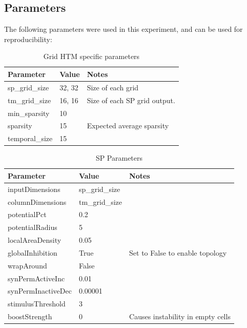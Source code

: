 \subsection{Parameters}
The following parameters were used in this experiment, and can be used for reproducibility:
\begin{table}[H]
    \centering
    \begin{tabularx}{\linewidth}{@{}XlX@{}}
        \toprule
        \textbf{Parameter} & \textbf{Value} & \textbf{Notes}               \\
        \midrule
        sp\_grid\_size     & 32, 32         & Size of each grid            \\
        tm\_grid\_size     & 16, 16         & Size of each SP grid output. \\
        min\_sparsity      & 10             &                              \\
        sparsity           & 15             & Expected average sparsity    \\
        temporal\_size     & 15             &                              \\
        \bottomrule
    \end{tabularx}
    \caption{Grid HTM specific parameters}
    \label{tab:surveillance_grid_htm}
\end{table}
\begin{table}[H]
    \centering
    \begin{tabularx}{\linewidth}{@{}XlX@{}}
        \toprule
        \textbf{Parameter} & \textbf{Value} & \textbf{Notes}                    \\
        \midrule
        inputDimensions    & sp\_grid\_size &                                   \\
        columnDimensions   & tm\_grid\_size &                                   \\
        potentialPct       & 0.2            &                                   \\
        potentialRadius    & 5              &                                   \\
        localAreaDensity   & 0.05           &                                   \\
        globalInhibition   & True           & Set to False to enable topology   \\
        wrapAround         & False          &                                   \\
        synPermActiveInc   & 0.01           &                                   \\
        synPermInactiveDec & 0.00001                                            \\
        stimulusThreshold  & 3              &                                   \\
        boostStrength      & 0              & Causes instability in empty cells \\
        \bottomrule
    \end{tabularx}
    \caption{SP Parameters}
    \label{tab:surveillance_sp}
\end{table}
